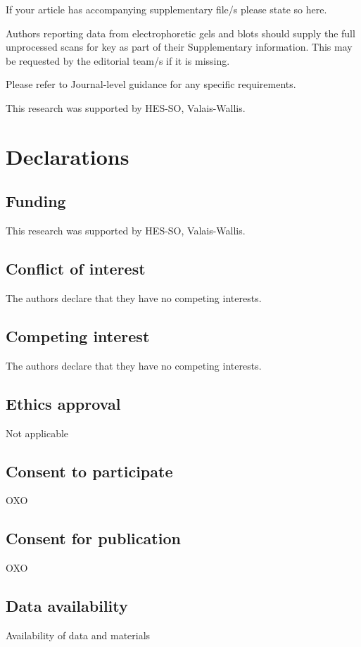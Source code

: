 \documentclass[sn-mathphys,Numbered]{sn-jnl}%
\theoremstyle{thmstyleone}%
\theoremstyle{thmstyletwo}%
\theoremstyle{thmstylethree}%
\begin{document}

If your article has accompanying supplementary file/s please state so here. 

Authors reporting data from electrophoretic gels and blots should supply the full unprocessed scans for key as part of their Supplementary information. This may be requested by the editorial team/s if it is missing.

Please refer to Journal-level guidance for any specific requirements.



This research was supported by HES-SO, Valais-Wallis. 

%
%
%
\section*{Declarations}
%
\subsection*{Funding}
%
This research was supported by HES-SO, Valais-Wallis. 
%
%
%
\subsection*{Conflict of interest}
%
The authors declare that they have no competing interests.
%
%
%
\subsection*{Competing interest}
%
The authors declare that they have no competing interests.
%
%
%
\subsection*{Ethics approval}
%
Not applicable
%
%
%
\subsection*{Consent to participate}
%
OXO
%
%
%
\subsection*{Consent for publication}
%
OXO
%
%
%
\subsection*{Data availability}
%
Availability of data and materials
%
%
%
\end{document}

